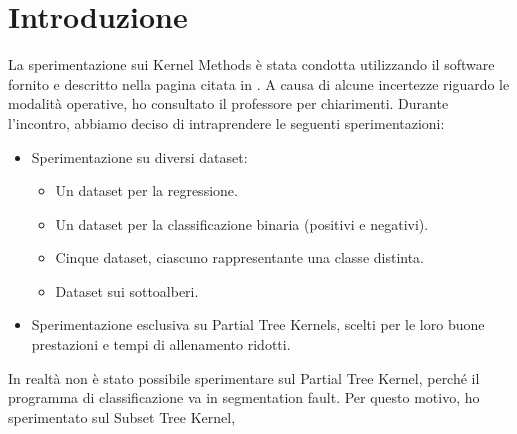 \section{Introduzione}

La sperimentazione sui Kernel Methods è stata condotta utilizzando il software 
fornito e descritto nella pagina citata in \cite{kernel}. A causa di alcune 
incertezze riguardo le modalità operative, ho consultato il professore per 
chiarimenti. Durante l'incontro, abbiamo deciso di intraprendere le seguenti 
sperimentazioni:

\begin{itemize}
    \item Sperimentazione su diversi dataset:
    \begin{itemize}
        \item Un dataset per la regressione.
        \item Un dataset per la classificazione binaria (positivi e negativi).
        \item Cinque dataset, ciascuno rappresentante una classe distinta.
        \item Dataset sui sottoalberi.
    \end{itemize}
    \item Sperimentazione esclusiva su Partial Tree Kernels, scelti per le loro 
    buone prestazioni e tempi di allenamento ridotti.
\end{itemize}

In realtà non è stato possibile sperimentare sul Partial Tree Kernel, perché il
programma di classificazione va in segmentation fault. Per questo motivo,
ho sperimentato sul Subset Tree Kernel,
